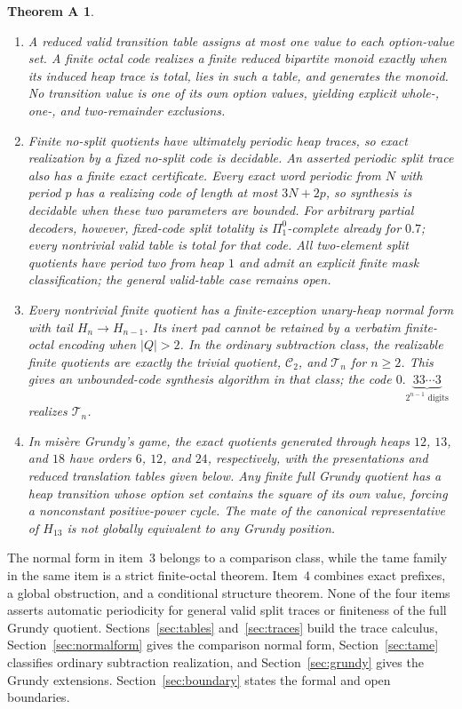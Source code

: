 \documentclass[11pt]{article}
\newtheorem*{thmA}{Theorem A}
\theoremstyle{definition}
\theoremstyle{remark}
\begin{document}
\begin{thmA}
\begin{enumerate}
\item A reduced valid transition table assigns at most one value to each
option-value set.  A finite octal code realizes a finite reduced bipartite
monoid exactly when its induced heap trace is total, lies in such a table,
and generates the monoid.  No transition value is one of its own option
values, yielding explicit whole-, one-, and two-remainder exclusions.
\item Finite no-split quotients have ultimately periodic heap traces, so exact
realization by a fixed no-split code is decidable.  An asserted periodic split
trace also has a finite exact certificate.  Every exact word periodic from
$N$ with period $p$ has a realizing code of length at most $3N+2p$,
so synthesis is decidable when these two parameters are bounded.
For arbitrary partial decoders,
however, fixed-code split totality is $\Pi^0_1$-complete already for $0.7$;
every nontrivial valid table is total for that code.  All two-element
split quotients have period two from heap $1$ and admit an explicit finite
mask classification; the general valid-table case remains open.
\item Every nontrivial finite quotient has a finite-exception unary-heap normal
form with tail $H_n\to H_{n-1}$.  Its inert pad cannot be retained by a
verbatim finite-octal encoding when $|Q|>2$.  In the ordinary subtraction
class, the realizable finite quotients are
exactly the trivial quotient, $\mathcal C_2$, and $\mathcal T_n$ for
$n\ge2$.  This gives an unbounded-code synthesis algorithm in that class;
the code \(0.\underbrace{33\cdots3}_{2^{n-1}\text{ digits}}\) realizes
$\mathcal T_n$.
\item In mis\`ere Grundy's game, the exact quotients generated through heaps
$12$, $13$, and $18$ have orders $6$, $12$, and $24$, respectively, with
the presentations and reduced translation tables given below.  Any finite
full Grundy quotient has a heap transition whose option set contains the
square of its own value, forcing a nonconstant positive-power cycle.
The mate of the canonical representative of $H_{13}$ is not globally
equivalent to any Grundy position.
\end{enumerate}
\end{thmA}

The normal form in item~3 belongs to a comparison class, while the tame family
in the same item is a strict finite-octal theorem.  Item~4 combines exact
prefixes, a global obstruction, and a conditional structure theorem.
None of the four items asserts
automatic periodicity for general valid split traces or finiteness of the full Grundy
quotient.
Sections~\ref{sec:tables} and~\ref{sec:traces} build the trace calculus,
Section~\ref{sec:normalform} gives the comparison normal form,
Section~\ref{sec:tame} classifies ordinary subtraction realization, and
Section~\ref{sec:grundy} gives the Grundy extensions.
Section~\ref{sec:boundary} states the formal and open boundaries.
\end{document}
